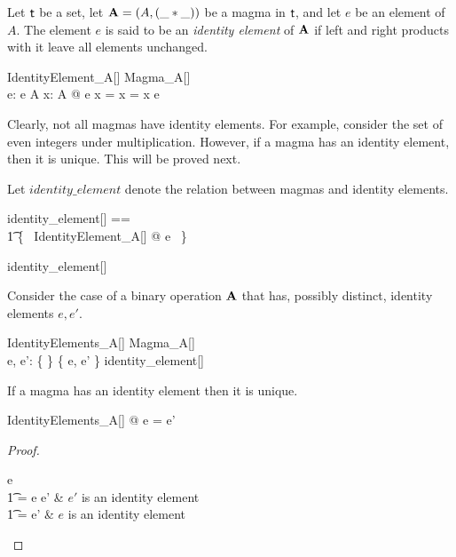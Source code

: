 \documentclass{amsart}
\begin{document}
Let $\mathsf{t}$ be a set, let $\mathbf{A} = (A, (\_ \mathbin{*} \_))$ be a magma in $\mathsf{t}$, and let $e$ be an element of $A$.
The element $e$ is said to be an \textit{identity element} of $\mathbf{A}$ if left and right 
products with it leave all elements unchanged.

\begin{schema}{IdentityElement\_A}[\genT]
	Magma\_A[\genT] \\
	e: \genT
\where
	e \in A
\also
	\forall x: A @ e \mulA x = x = x \mulA e
\end{schema}

Clearly, not all magmas have identity elements.
For example, consider the set of even integers under multiplication.
However, if a magma has an identity element, then it is unique.
This will be proved next.

Let $identity\_element$ denote the relation between magmas and identity elements.
\begin{zed}
	identity\_element[\genT] == \\
	\t1	\{~ IdentityElement\_A[\genT] @ \strucA \mapsto e ~\}
\end{zed}

\begin{remark}
\begin{zed}
	identity\_element[\setT] \in \magma \setT \rel \setT
\end{zed}
\end{remark}

Consider the case of a binary operation $\mathbf{A}$ that has, possibly distinct, identity elements $e, e'$.
\begin{schema}{IdentityElements\_A}[\genT]
	Magma\_A[\genT] \\
	e, e': \genT
\where
	\{ \strucA \} \cross \{ e, e' \} \subseteq identity\_element[\genT]
\end{schema}

\begin{remark}
If a magma has an identity element then it is unique.

\begin{zed}
	\forall IdentityElements\_A[\setT] @ e = e'
\end{zed}

\begin{proof}
\begin{argue}
e \\
\t1	= e \mulA e'	& $e'$ is an identity element \\
\t1	= e'			& $e$ is an identity element
\end{argue}
\end{proof}

\end{remark}
\end{document}
